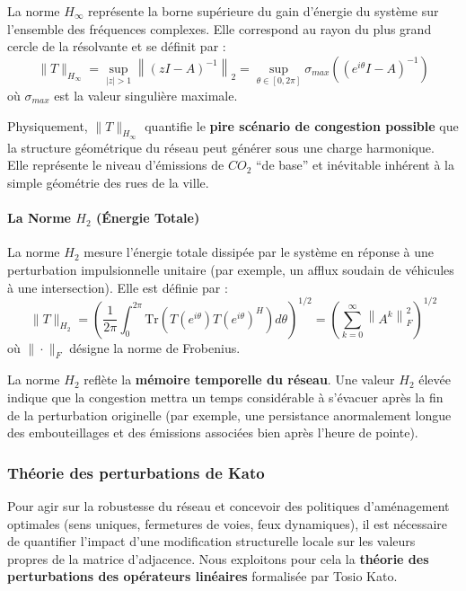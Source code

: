 \documentclass[10pt, a4paper]{article}
\begin{document}
La norme \(H_\infty\) représente la borne supérieure du gain d'énergie
du système sur l'ensemble des fréquences complexes. Elle correspond au
rayon du plus grand cercle de la résolvante et se définit par :
\[\|T\|_{H_\infty} = \sup_{|z| > 1} \left\| (zI - A)^{-1} \right\|_2 = \sup_{\theta \in [0, 2\pi]} \sigma_{max}\left( (e^{i\theta}I - A)^{-1} \right)\]
où \(\sigma_{max}\) est la valeur singulière maximale.

Physiquement, \(\|T\|_{H_\infty}\) quantifie le \textbf{pire scénario de
congestion possible} que la structure géométrique du réseau peut générer
sous une charge harmonique. Elle représente le niveau d'émissions de
\(CO_2\) ``de base'' et inévitable inhérent à la simple géométrie des
rues de la ville.

\paragraph{\texorpdfstring{La Norme \(H_2\) (Énergie
Totale)}{La Norme H\_2 (Énergie Totale)}}\label{la-norme-h_2-uxe9nergie-totale}

La norme \(H_2\) mesure l'énergie totale dissipée par le système en
réponse à une perturbation impulsionnelle unitaire (par exemple, un
afflux soudain de véhicules à une intersection). Elle est définie par :
\[\|T\|_{H_2} = \left( \frac{1}{2\pi} \int_{0}^{2\pi} \text{Tr}\left( T(e^{i\theta}) T(e^{i\theta})^H \right) d\theta \right)^{1/2} = \left( \sum_{k=0}^{\infty} \left\| A^k \right\|_F^2 \right)^{1/2}\]
où \(\|\cdot\|_F\) désigne la norme de Frobenius.

La norme \(H_2\) reflète la \textbf{mémoire temporelle du réseau}. Une
valeur \(H_2\) élevée indique que la congestion mettra un temps
considérable à s'évacuer après la fin de la perturbation originelle (par
exemple, une persistance anormalement longue des embouteillages et des
émissions associées bien après l'heure de pointe).

\subsubsection{Théorie des perturbations de
Kato}\label{thuxe9orie-des-perturbations-de-kato}

Pour agir sur la robustesse du réseau et concevoir des politiques
d'aménagement optimales (sens uniques, fermetures de voies, feux
dynamiques), il est nécessaire de quantifier l'impact d'une modification
structurelle locale sur les valeurs propres de la matrice d'adjacence.
Nous exploitons pour cela la \textbf{théorie des perturbations des
opérateurs linéaires} formalisée par Tosio Kato.
\end{document}
